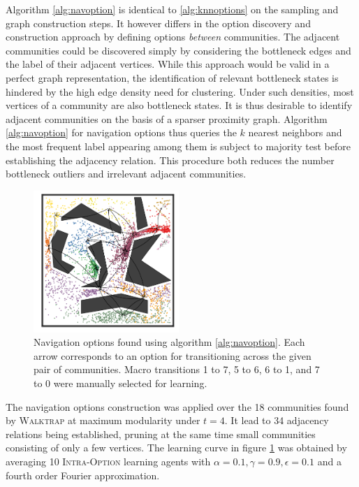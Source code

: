 Algorithm \ref{alg:navoption} is identical to \ref{alg:knnoptions} on the sampling and graph construction steps. It however differs in the option discovery and construction approach by defining options \textit{between} communities. The adjacent communities could be discovered simply by considering the bottleneck edges and the label of their adjacent vertices. While this approach would be valid in a perfect graph representation, the identification of relevant bottleneck states is hindered by the high edge density need for clustering. Under such densities, most vertices of a community are also bottleneck states. It is thus desirable to identify adjacent communities on the basis of a sparser proximity graph. Algorithm \ref{alg:navoption} for navigation options thus queries the $k$ nearest neighbors and the most frequent label appearing among them is subject to majority test before establishing the adjacency relation. This procedure both reduces the number bottleneck outliers and irrelevant adjacent communities.

\begin{figure}
\centering
\includegraphics[width=0.49\textwidth]{fig/pinball-nav.pdf}
\caption{Navigation options found using algorithm \ref{alg:navoption}. Each arrow corresponds to an option for transitioning across the given pair of communities. Macro transitions 1 to 7, 5 to 6, 6 to 1, and 7 to 0 were manually selected for learning.}
\label{fig:nav-options}
\end{figure}

The navigation options construction was applied over the 18 communities found by \textsc{Walktrap} at maximum modularity under $t=4$. It lead to 34 adjacency relations being established, pruning at the same time small communities consisting of only a few vertices. The learning curve in figure \ref{fig:nav-options} was obtained by averaging 10 \textsc{Intra-Option} learning agents with $\alpha = 0.1, \gamma = 0.9, \epsilon = 0.1$ and a fourth order Fourier approximation. 

